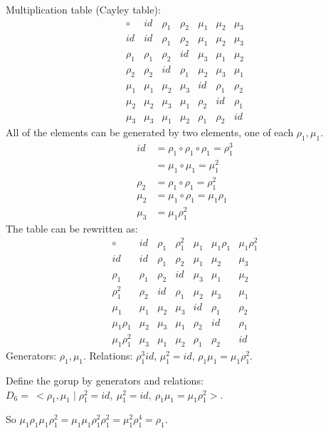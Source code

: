 \documentclass[]{article}
\begin{document}
\begin{example}
	Multiplication table (Cayley table):
	$$\begin{array}{c|cccccc}
		\circ & id & \rho_1 & \rho_2 & \mu_1 & \mu_2 & \mu_3 \\ 
		\hline
		id & id & \rho_1 & \rho_2 & \mu_1 & \mu_2 & \mu_3 \\ 
		\rho_1 & \rho_1 & \rho_2 & id & \mu_3 & \mu_1 & \mu_2 \\ 
		\rho_2 & \rho_2 & id & \rho_1 & \mu_2 & \mu_3 & \mu_1 \\ 
		\mu_1 & \mu_1 & \mu_2 & \mu_3 & id & \rho_1 & \rho_2 \\ 
		\mu_2 & \mu_2 & \mu_3 & \mu_1 & \rho_2 & id & \rho_1 \\ 
		\mu_3 & \mu_3 & \mu_1 & \mu_2 & \rho_1 & \rho_2 & id
	\end{array}$$
	All of the elements can be generated by two elements, one of each $\rho_1,\mu_1$.
	\begin{align*}
		id &= \rho_1\circ \rho_1 \circ \rho_1 = \rho_1^3 \\
		   &= \mu_1\circ\mu_1 = \mu_1^2 \\
		\rho_2 &= \rho_1\circ\rho_1 = \rho_1^2 \\
		\mu_2 &= \mu_1\circ\rho_1 = \mu_1\rho_1 \\
		\mu_3 &= \mu_1\rho_1^2
	\end{align*}
	The table can be rewritten as:
	$$\begin{array}{c|cccccc}
		\circ & id & \rho_1 & \rho_1^2 & \mu_1 & \mu_1\rho_1 & \mu_1\rho_1^2 \\
     	\hline
     	id & id & \rho_1 & \rho_2 & \mu_1 & \mu_2 & \mu_3 \\
     	\rho_1 & \rho_1 & \rho_2 & id & \mu_3 & \mu_1 & \mu_2 \\
	 	\rho_1^2 & \rho_2 & id & \rho_1 & \mu_2 & \mu_3 & \mu_1 \\
     	\mu_1 & \mu_1 & \mu_2 & \mu_3 & id & \rho_1 & \rho_2 \\
     	\mu_1\rho_1 & \mu_2 & \mu_3 & \mu_1 & \rho_2 & id & \rho_1 \\
     	\mu_1\rho_1^2 & \mu_3 & \mu_1 & \mu_2 & \rho_1 & \rho_2 & id
 	\end{array}$$
	Generators: $\rho_1,\mu_1$.
	Relations: $\rho_1^3 id$, $\mu_1^2 = id$, $\rho_1\mu_1 = \mu_1\rho_1^2$.

	Define the gorup by generators and relations: $D_6 =\ <\rho_1,\mu_1 \mid \rho_1^2 = id,\ \mu_1^2 = id,\ \rho_1\mu_1 = \mu_1\rho_1^2 >$.

	So $\mu_1\rho_1\mu_1\rho_1^2 = \mu_1\mu_1\rho_1^2\rho_1^2 = \mu_1^2\rho_1^4 = \rho_1$.
\end{example}
\end{document}

